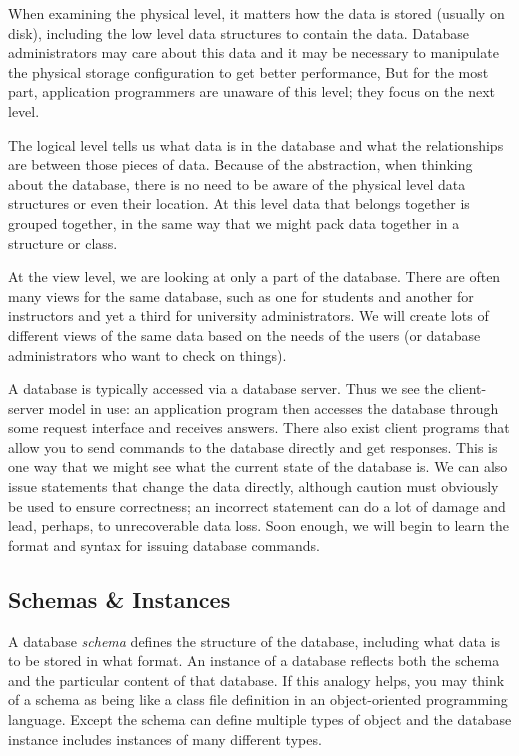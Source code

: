 \documentclass[a4paper]{report}
\begin{document}
When examining the physical level, it matters how the data is stored (usually on disk), including the low level data structures to contain the data. Database administrators may care about this data and it may be necessary to manipulate the physical storage configuration to get better performance, But for the most part, application programmers are unaware of this level; they focus on the next level.

The logical level tells us what data is in the database and what the relationships are between those pieces of data. Because of the abstraction, when thinking about the database, there is no need to be aware of the physical level data structures or even their location. At this level data that belongs together is grouped together, in the same way that we might pack data together in a structure or class.

At the view level, we are looking at only a part of the database. There are often many views for the same database, such as one for students and another for instructors and yet a third for university administrators. We will create lots of different views of the same data based on the needs of the users (or database administrators who want to check on things).

A database is typically accessed via a database server. Thus we see the client-server model in use: an application program then accesses the database through some request interface and receives answers. There also exist client programs that allow you to send commands to the database directly and get responses. This is one way that we might see what the current state of the database is. We can also issue statements that change the data directly, although caution must obviously be used to ensure correctness; an incorrect statement can do a lot of damage and lead, perhaps, to unrecoverable data loss. Soon enough, we will begin to learn the format and syntax for issuing database commands.


\subsection*{Schemas \& Instances}

A database \textit{schema} defines the structure of the database, including what data is  to be stored in what format. An instance of a database reflects both the schema and the particular content of that database. If this analogy helps, you may think of a schema as being like a class file definition in an object-oriented programming language. Except the schema can define multiple types of object and the database instance includes instances of many different types.
\end{document}
